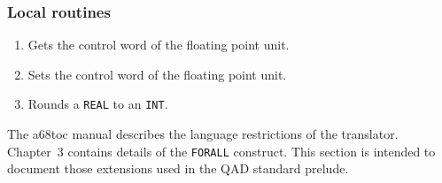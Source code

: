 \subsubsection*{Local routines}
\begin{enumerate}
\item {}\newline
Gets the control word of the floating point unit.
\item {}\newline
Sets the control word of the floating point unit.
\item {}\newline
Rounds a \verb|REAL| to an \verb|INT|.
\end{enumerate}

The a68toc manual describes the language restrictions of the
translator. Chapter~3 contains details of the \verb|FORALL|
construct.  This section is intended to document those extensions
used in the QAD standard prelude.

